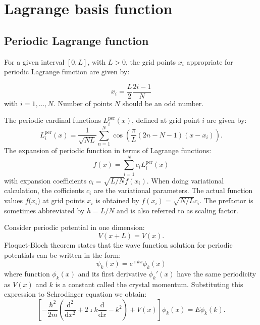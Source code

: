 \section{Lagrange basis function}

\subsection{Periodic Lagrange function}

For a given interval $[0,L]$, with $L>0$, the grid points $x_{i}$
appropriate for periodic Lagrange function are given by:

\begin{equation}
x_{i}=\frac{L}{2}\frac{2i-1}{N}
\end{equation}
with $i=1,\ldots,N$. Number of points $N$ should be an odd number.

The periodic cardinal functions $L_{i}^{\mathrm{per}}(x)$, defined
at grid point $i$ are given by:
\begin{equation}
L_{i}^{\mathrm{per}}(x)=\frac{1}{\sqrt{NL}}\sum_{n=1}^{N}\cos\left(\frac{\pi}{L}(2n-N-1)(x-x_{i})\right).
\end{equation}
The expansion of periodic function in terms of Lagrange functions:
\begin{equation}
f(x)=\sum_{i=1}^{N}c_{i}L_{i}^{\mathrm{per}}(x)
\end{equation}
with expansion coefficients $c_{i}=\sqrt{L/N}f(x_{i})$. When doing
variational calculation, the cofficients $c_{i}$ are the variational
parameters. The actual function values $f(x_{i}$) at grid points
$x_{i}$ is obtained by $f(x_{i})=\sqrt{N/L}c_{i}$. The prefactor
is sometimes abbreviated by $h=L/N$ and is also referred to as scaling
factor.

Consider periodic potential in one dimension:
\begin{equation}
V(x+L)=V(x).
\end{equation}
Floquet-Bloch theorem states that the wave function solution for periodic
potentials can be written in the form:
\begin{equation}
\psi_{k}(x)=e^{\imath kx}\phi_{k}(x)
\end{equation}
where function $\phi_{k}(x)$ and its first derivative $\phi_{k}'(x)$
have the same periodicity as $V(x)$ and $k$ is a constant called
the crystal momentum. Substituting this expression to Schrodinger
equation we obtain:
\begin{equation}
\left[-\frac{\hbar^{2}}{2m}\left(\frac{\mathrm{d}^{2}}{\mathrm{d}x^{2}}+2\imath k\frac{\mathrm{d}}{\mathrm{d}x}-k^{2}\right)+V(x)\right]\phi_{k}(x)=E\phi_{k}(k).
\end{equation}


